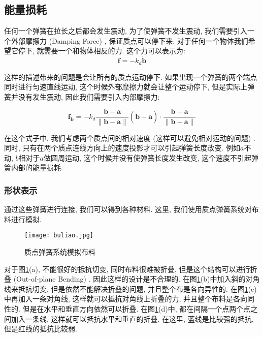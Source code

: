 \subsection{能量损耗}

任何一个弹簧在拉长之后都会发生震动, 为了使弹簧不发生震动, 我们需要引入一个外部摩擦力 (Damping Force) , 保证质点可以停下来. 对于任何一个物体我们希望它停下, 就需要一个和物体相反的力. 这个力可以表示为: 
\begin{equation}
	\mathbf{f}=-k_d\mathbf{\dot{b}}
\end{equation}

这样的描述带来的问题是会让所有的质点运动停下. 如果出现一个弹簧的两个端点同时进行匀速直线运动, 这个时候外部摩擦力就会让整个运动停下, 但是实际上弹簧并没有发生震动, 因此我们需要引入内部摩擦力: 

\begin{equation}
	\mathbf{f}_{\mathbf{b}}=-k_{d}\frac{\mathbf{b}-\mathbf{a}}{\|\mathbf{b}-\mathbf{a}\|}(\dot{\mathbf{b}}-\dot{\mathbf{a}})\cdot \frac{\mathbf{b}-\mathbf{a}}{\|\mathbf{b}-\mathbf{a}\|}
\end{equation}

在这个式子中, 我们考虑两个质点间的相对速度 (这样可以避免相对运动的问题) . 同时, 只有在两个质点连线方向上的速度投影才可以引起弹簧长度改变. 例如$a$不动, $b$相对于$a$做圆周运动, 这个时候并没有使弹簧长度发生改变, 这个速度不引起弹簧内部的能量损耗. 

\subsubsection{形状表示}

通过这些弹簧进行连接, 我们可以得到各种材料. 这里, 我们使用质点弹簧系统对布料进行模拟. 

\begin{figure}[H]
	\centering
	\texttt{[image: buliao.jpg]}
	\caption{质点弹簧系统模拟布料}
	\label{fig:buliao}
\end{figure}

对于图\ref{fig:buliao}(a), 不能很好的抵抗切变, 同时布料很难被折叠, 但是这个结构可以进行折叠 (Out-of-plane Bending) . 因此这样的设计是不合理的. 在图\ref{fig:buliao}(b)中加入斜的对角线来抵抗切变, 但是依然不能解决折叠的问题, 并且整个布是各向异性的. 在图\ref{fig:buliao}(c)中再加入一条对角线, 这样就可以抵抗对角线上折叠的力, 并且整个布料是各向同性的. 但是在水平和垂直方向依然可以折叠. 在图\ref{fig:buliao}(d)中, 都在间隔一个点两个点之间加入一条线, 这样就可以抵抗水平和垂直的折叠. 在这里, 蓝线是比较强的抵抗, 但是红线的抵抗比较弱. 


